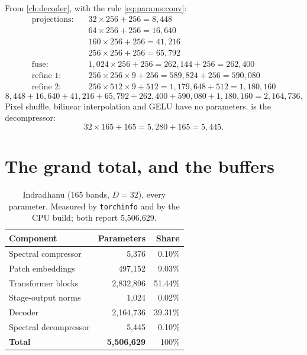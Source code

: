 From \cref{ch:decoder}, with the rule \eqref{eq:params:conv}:
\begin{align*}
\text{projections:}\quad & 32 \times 256 + 256 = 8{,}448\\
 & 64 \times 256 + 256 = 16{,}640\\
 & 160 \times 256 + 256 = 41{,}216\\
 & 256 \times 256 + 256 = 65{,}792\\
\text{fuse:}\quad & 1{,}024 \times 256 + 256 = 262{,}144 + 256 = 262{,}400\\
\text{refine 1:}\quad & 256 \times 256 \times 9 + 256 = 589{,}824 + 256 = 590{,}080\\
\text{refine 2:}\quad & 256 \times 512 \times 9 + 512 = 1{,}179{,}648 + 512 = 1{,}180{,}160
\end{align*}
\[
8{,}448 + 16{,}640 + 41{,}216 + 65{,}792 + 262{,}400 + 590{,}080 + 1{,}180{,}160 = 2{,}164{,}736 .
\]
Pixel shuffle, bilinear interpolation and GELU have no parameters.
 is the decompressor:
\[
32 \times 165 + 165 = 5{,}280 + 165 = 5{,}445 .
\]

\section{The grand total, and the buffers}\label{sec:params:total}

\begin{table}[htbp]\centering
\caption{Indradhanu (165 bands, $D = 32$), every parameter. Measured by
\texttt{torchinfo} and by the CPU
build; both report 5,506,629.}\label{tab:params:total}
\begin{tabular}{@{}lrr@{}}\toprule
Component & Parameters & Share \\\midrule
Spectral compressor & 5,376 & 0.10\% \\
Patch embeddings & 497,152 & 9.03\% \\
Transformer blocks & 2,832,896 & 51.44\% \\
Stage-output norms & 1,024 & 0.02\% \\
Decoder & 2,164,736 & 39.31\% \\
Spectral decompressor & 5,445 & 0.10\% \\\midrule
\textbf{Total} & \textbf{5,506,629} & 100\% \\\bottomrule
\end{tabular}
\end{table}

